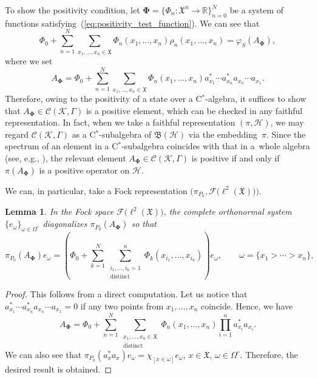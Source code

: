 \documentclass[11pt]{article}
\numberwithin{equation}{section}
\numberwithin{equation}{section}
\newtheorem{Lemma}[Theorem]{Lemma}
\newcommand{\mfrak}[1]{\mathfrak{#1}}
\newcommand{\mcal}[1]{\mathcal{#1}}
\newcommand{\mbb}[1]{\mathbb{#1}}
\newcommand{\mrm}[1]{\mathrm{#1}}
\begin{document}
To show the positivity condition, let $\bm{\Phi}=\big\{\Phi_{n}\colon\mfrak{X}^{n}\to\mbb{R}\big\}_{n=0}^{N}$ be a system of functions satisfying~(\ref{eq:positivity_test_function}).
We can see that
\begin{equation*}
	\Phi_{0}+\sum_{n=1}^{N}\sum_{x_{1},\dots, x_{n}\in\mfrak{X}}\Phi_{n}(x_{1},\dots, x_{n})\rho_{n}(x_{1},\dots, x_{n})
	=\varphi_{S} (A_{\bm{\Phi}} ),
\end{equation*}
where we set
\begin{equation*}
	A_{\bm{\Phi}}=\Phi_{0}+\sum_{n=1}^{N}\sum_{x_{1},\dots,x_{n}\in\mfrak{X}}\Phi_{n}(x_{1},\dots,x_{n})a_{x_{1}}^{\ast}\cdots a_{x_{n}}^{\ast}a_{x_{n}}\cdots a_{x_{1}}.
\end{equation*}
Therefore, owing to the positivity of a state over a C$^{\ast}$-algebra, it suffices to show that $A_{\bm{\Phi}}\in\mcal{C}(\mcal{K},\Gamma)$ is a positive element, which can be checked in any faithful representation. In fact, when we take a faithful representation $(\pi,\mcal{H})$, we may regard $\mcal{C}(\mcal{K},\Gamma)$ as a C$^{\ast}$-subalgebra of $\mfrak{B}(\mcal{H})$ via the embedding~$\pi$. Since the spectrum of an element in a C$^{\ast}$-subalgebra coincides with that in a~whole algebra (see, e.g., \cite[Proposition~2.2.7]{BratteliRobinson1987}), the relevant element $A_{\bm{\Phi}}\in\mcal{C}(\mcal{K},\Gamma)$ is positive if and only if $\pi \left(A_{\bm{\Phi}}\right)$ is a positive operator on $\mcal{H}$.

We can, in particular, take a Fock representation $\big(\pi_{P_{0}},\mcal{F}\big(\ell^{2}(\mfrak{X})\big)\big)$.
\begin{Lemma}
In the Fock space $\mcal{F}\big(\ell^{2}(\mfrak{X})\big)$, the complete orthonormal system $\{e_{\omega}\}_{\omega\in\Omega^{\circ}}$ diagonalizes $\pi_{P_{0}} (A_{\bm{\Phi}} )$ so that
\begin{equation*}
	\pi_{P_{0}}\left(A_{\bm{\Phi}}\right) e_{\omega}=\left(\Phi_{0}+\sum_{k=1}^{N}\sum_{\substack{i_{1},\dots,i_{k}=1\\ \mrm{distinct}}}^{n}\Phi_{k}(x_{i_{1}},\dots, x_{i_{k}})\right) e_{\omega},\qquad \omega=\{x_{1}>\cdots >x_{n}\},
\end{equation*}
\end{Lemma}
\begin{proof}
This follows from a direct computation.
Let us notice that $a_{x_{1}}^{\ast}\cdots a_{x_{n}}^{\ast}a_{x_{n}}\cdots a_{x_{1}}=0$ if any two points from $x_{1},\dots, x_{n}$ coincide. Hence, we have
\begin{equation*}
	A_{\bm{\Phi}}=\Phi_{0}+\sum_{n=1}^{N}\sum_{\substack{x_{1},\dots,x_{n}\in\mfrak{X}\\ \mrm{distinct}}}\Phi_{n}(x_{1},\dots,x_{n})\prod_{i=1}^{n}a_{x_{i}}^{\ast}a_{x_{i}}.
\end{equation*}
We can also see that $\pi_{P_{0}}(a_{x}^{\ast}a_{x})e_{\omega}=\chi_{[x\in\omega]}e_{\omega}$, $x\in\mfrak{X}$, $\omega\in\Omega^{\circ}$. Therefore, the desired result is obtained.
\end{proof}
\end{document}
